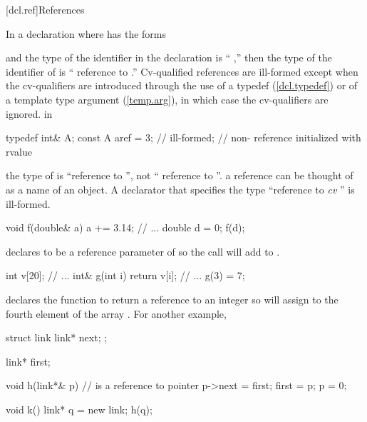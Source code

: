 [dcl.ref]{References}%

\pnum
In a declaration
where
has the forms

\begin{ncsimplebnf}
\terminal{\&} 
\end{ncsimplebnf}

and the type of the identifier in the declaration
is ``
,''
then the type of the identifier of
is `` reference to
.''
Cv-qualified references are ill-formed except when the cv-qualifiers
are introduced through the use of a typedef (\ref{dcl.typedef}) or
of a template type argument (\ref{temp.arg}),
in which case the cv-qualifiers are ignored.
\enterexample
in

\begin{codeblock}
typedef int& A;
const A aref = 3;		// ill-formed;
				// non- reference initialized with rvalue
\end{codeblock}

the type of
is ``reference to '',
not `` reference to ''.
\exitexample
{}%
\enternote
a reference can be thought of as a name of an object.
\exitnote
A declarator that specifies the type
``reference to \textit{cv} ''
is ill-formed.


\pnum
{}%
%
\enterexample

\begin{codeblock}
void f(double& a) { a += 3.14; }
// ...
double d = 0;
f(d);
\end{codeblock}

declares
to be a reference parameter of
so the call
will add
to
.

\begin{codeblock}
int v[20];
// ...
int& g(int i) { return v[i]; }
// ...
g(3) = 7;
\end{codeblock}

declares the function
to return a reference to an integer so
will assign
to the fourth element of the array
.
For another example,

\begin{codeblock}
struct link {
    link* next;
};

link* first;

void h(link*& p)		//  is a reference to pointer
{
    p->next = first;
    first = p;
    p = 0;
}

void k()
{
	link* q = new link;
	h(q);
}
\end{codeblock}

